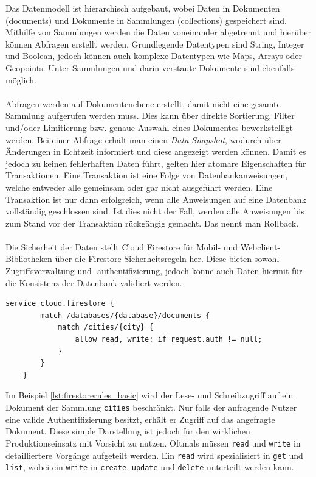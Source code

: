 Das Datenmodell ist hierarchisch aufgebaut, wobei Daten in Dokumenten (documents) und Dokumente in Sammlungen (collections) gespeichert sind. 
Mithilfe von Sammlungen werden die Daten voneinander abgetrennt und hierüber können Abfragen erstellt werden.
Grundlegende Datentypen sind String, Integer und Boolean, jedoch können auch komplexe Datentypen wie Maps, Arrays oder Geopoints. Unter-Sammlungen und darin verstaute Dokumente sind ebenfalls möglich.\\
\\
Abfragen werden auf Dokumentenebene erstellt, damit nicht eine gesamte Sammlung aufgerufen werden muss.
Dies kann über direkte Sortierung, Filter und/oder Limitierung bzw. genaue Auswahl eines Dokumentes bewerkstelligt werden.
Bei einer Abfrage erhält man einen \textit{Data Snapshot}, wodurch über Änderungen in Echtzeit informiert und diese angezeigt werden können.
Damit es jedoch zu keinen fehlerhaften Daten führt, gelten hier atomare Eigenschaften für Transaktionen.
Eine Transaktion ist eine Folge von Datenbankanweisungen, welche entweder alle gemeinsam oder gar nicht ausgeführt werden. 
Eine Transaktion ist nur dann erfolgreich, wenn alle Anweisungen auf eine Datenbank vollständig geschlossen sind. 
Ist dies nicht der Fall, werden alle Anweisungen bis zum Stand vor der Transaktion rückgängig gemacht. Das nennt man Rollback.\\
\\
Die Sicherheit der Daten stellt Cloud Firestore für Mobil- und Webclient-Bibliotheken über die Firestore-Sicherheitsregeln her. Diese bieten sowohl Zugriffsverwaltung und -authentifizierung, jedoch könne auch Daten hiermit für die Konsistenz der Datenbank validiert werden. 
\medskip
\begin{lstlisting}[caption=Beschränkung des Zugriffs auf Dokumente der Sammlung \texttt{cities}, label=lst:firestorerules_basic]
	service cloud.firestore {
		match /databases/{database}/documents {
			match /cities/{city} {
				allow read, write: if request.auth != null;
			}
		}
	}
\end{lstlisting}
\medskip
Im Beispiel \ref{lst:firestorerules_basic} wird der Lese- und Schreibzugriff auf ein Dokument der Sammlung \texttt{cities} beschränkt. 
Nur falls der anfragende Nutzer eine valide Authentifizierung besitzt, erhält er Zugriff auf das angefragte Dokument. 
Diese simple Darstellung ist jedoch für den wirklichen Produktionseinsatz mit Vorsicht zu nutzen. 
Oftmals müssen \texttt{read} und \texttt{write} in detailliertere Vorgänge aufgeteilt werden. Ein \texttt{read} wird spezialisiert in \texttt{get} und \texttt{list}, wobei ein \texttt{write} in \texttt{create}, \texttt{update} und \texttt{delete} unterteilt werden kann.
